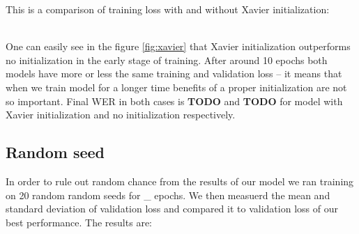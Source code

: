 \documentclass[licencjacka,en]{pracamgr}
\begin{document}
This is a comparison of training loss with and without Xavier initialization:

\noindent%
\begin{minipage}{\linewidth}%
		\label{fig:xavier}		     
\end{minipage}\\


One can easily see in the figure \ref{fig:xavier} that Xavier initialization outperforms no initialization in the early stage of training. After around 10 epochs both models have more or less the same training and validation loss -- it means that when we train model for a longer time benefits of a proper initialization are not so important. Final WER in both cases is \textbf{TODO} and \textbf{TODO} for model with Xavier initialization and no initialization respectively. 

\subsection{Random seed}
In order to rule out random chance from the results of our model we ran training on 20 random random seeds for \_ epochs. We then measuerd the mean and standard deviation of validation loss and compared it to validation loss of our best performance. The results are:
\end{document}
